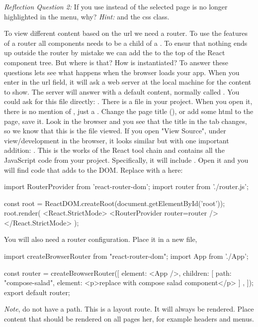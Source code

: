 \documentclass[fleqn, article, a4paper]{memoir}
\begin{document}
\begin{Assignments}
\noindent \emph{Reflection Question 2:} If you use  instead of  the selected page is no longer highlighted in the menu, why? \emph{Hint:}  and the  css class.

\item To view different content based on the url we need a router. To use the features of a router all components needs to be a child of a . To ensur that nothing ends up outside the router by mistake we can add the  to the top of the React component tree. But where is that? How is  instantiated? To answer these questions lets see what happens when the browser loads your app. When you enter  in the url field, it will ask a web server at the local machine for the content to show. The server will answer with a default content, normally called . You could ask for this file directly: . There is a  file in your project. When you open it, there is no mention of , just a . Change the page title (), or add some html to the page, save it. Look in the browser and you see that the title in the tab changes, so we know that this is the file viewed. If you open "View Source", under view/development in the browser, it looks similar but with one important addition: . This is the works of the React tool chain and  contains all the JavaScript code from your project. Specifically, it will include . Open it and you will find code that adds  to the DOM. Replace  with a  here:

\begin{Code}
import { RouterProvider } from 'react-router-dom';
import router from './router.js';

const root = ReactDOM.createRoot(document.getElementById('root'));
root.render(
  <React.StrictMode>
    <RouterProvider router={router} />
  </React.StrictMode>
);
\end{Code}

\noindent You will also need a router configuration. Place it in a new file, 
\begin{Code}
import { createBrowserRouter } from "react-router-dom";
import App from './App';

const router = createBrowserRouter([
  {
    element: <App />,
    children: [
      {
        path: "compose-salad",
        element: <p>replace with compose salad component</p>
      }]
  },
]);
export default router;
\end{Code}
\noindent \emph{Note},  do not have a path. This is a layout route. It will always be rendered. Place content that should be rendered on all pages her, for example headers and menus.


\end{Assignments}
\end{document}

